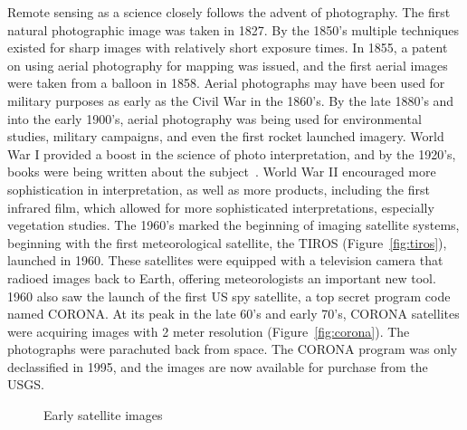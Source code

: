 \documentclass{ucdthesis}       %
\begin{document}
Remote sensing as a science closely follows the advent of photography.
The first natural photographic image was taken in 1827.  By the 1850's
multiple techniques existed for sharp images with relatively short
exposure times.  In 1855, a patent on using aerial photography for
mapping was issued, and the first aerial images were taken from a
balloon in 1858.  Aerial photographs may have been used for military
purposes as early as the Civil War in the 1860's.  By the late 1880's
and into the early 1900's, aerial photography was being used for
environmental studies, military campaigns, and even the first rocket
launched imagery.  World War I provided a boost in the science of
photo interpretation, and by the 1920's, books were being written
about the subject~\cite{reeves27aerial-photog,
  winchester28aerial-photog}.  World War II encouraged more
sophistication in interpretation, as well as more products, including
the first infrared film, which allowed for more sophisticated
interpretations, especially vegetation studies.  The 1960's marked the
beginning of imaging satellite systems, beginning with the first
meteorological satellite, the \ac{TIROS} (Figure~\ref{fig:tiros}),
launched in 1960.  These satellites were equipped with a television
camera that radioed images back to Earth, offering meteorologists an
important new tool.  1960 also saw the launch of the first US spy
satellite, a top secret program code named CORONA.  At its peak in the
late 60's and early 70's, CORONA satellites were acquiring images with
2 meter resolution (Figure~\ref{fig:corona}).  The photographs were
parachuted back from space.  The CORONA program was only declassified
in 1995, and the images are now available for purchase from the
\ac{USGS}.

\begin{figure}[htb]
  \centering
   \quad
  \caption{Early satellite images}
  \label{fig:early-satellites}
\end{figure}
\end{document}
